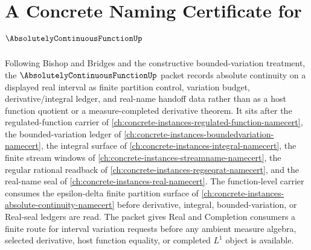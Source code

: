 \chapter{A Concrete Naming Certificate for $\AbsolutelyContinuousFunctionUp$}
\label{ch:concrete-instances-absolute-continuous-function-namecert}

Following Bishop and Bridges and the constructive bounded-variation treatment, the $\AbsolutelyContinuousFunctionUp$ packet records absolute continuity on a displayed real interval as finite partition control, variation budget, derivative/integral ledger, and real-name handoff data rather than as a host function quotient or a measure-completed derivative theorem. It sits after the regulated-function carrier of \autoref{ch:concrete-instances-regulated-function-namecert}, the bounded-variation ledger of \autoref{ch:concrete-instances-boundedvariation-namecert}, the integral surface of \autoref{ch:concrete-instances-integral-namecert}, the finite stream windows of \autoref{ch:concrete-instances-streamname-namecert}, the regular rational readback of \autoref{ch:concrete-instances-regseqrat-namecert}, and the real-name seal of \autoref{ch:concrete-instances-real-namecert}. The function-level carrier consumes the epsilon-delta finite partition surface of \autoref{ch:concrete-instances-absolute-continuity-namecert} before derivative, integral, bounded-variation, or Real-seal ledgers are read. The packet gives Real and Completion consumers a finite route for interval variation requests before any ambient measure algebra, selected derivative, host function equality, or completed $L^1$ object is available.

